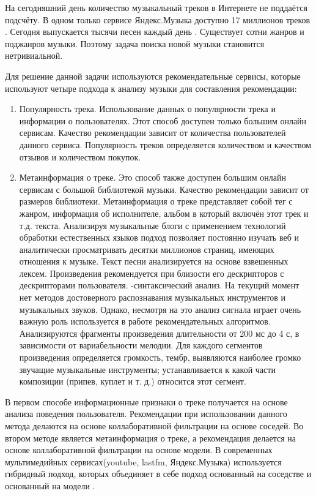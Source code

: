 \label{sec:intro}

На сегодняшний день количество музыкальный треков в Интернете не поддаётся подсчёту. В одном только сервисе Яндекс.Музыка доступно 17 миллионов треков  \cite{yandex_blog} . Сегодня выпускается тысячи песен каждый день \cite{forbes}. Существует сотни жанров и поджанров музыки. Поэтому задача поиска новой музыки становится нетривиальной. 

Для решение данной задачи используются рекомендательные сервисы, которые используют четыре подхода к анализу музыки для составления рекомендации:
\begin{enumerate}[label=\arabic*.]
\item Популярность трека. Использование данных о популярности трека и информации о пользователях. Этот способ доступен только большим онлайн сервисам. Качество рекомендации зависит от количества пользователей данного сервиса. Популярность треков определяется количеством и качеством отзывов и количеством покупок. 
\item Метаинформация о треке. Это способ также доступен большим онлайн сервисам с большой библиотекой музыки. Качество рекомендации зависит от размеров библиотеки. Метаинформация о треке представляет собой тег с жанром, информация об исполнителе, альбом в который включён этот трек и т.д.
 текста. Анализируя музыкальные блоги с применением технологий обработки естественных языков подход позволяет постоянно изучать веб и аналитически просматривать десятки миллионов страниц, имеющих отношения к музыке. Текст песни анализируется на основе взвешенных лексем. Произведения рекомендуется при близости его дескрипторов с дескрипторами пользователя.
-синтаксический анализ. На текущий момент нет методов достоверного распознавания музыкальных инструментов и музыкальных звуков. Однако, несмотря на это анализ сигнала играет очень важную роль используется в работе рекомендательных алгоритмов. Анализируются фрагменты произведения длительности от 200 мс до 4 с, в зависимости от вариабельности мелодии.  Для каждого сегментов произведения определяется громкость, тембр,  выявляются наиболее громко звучащие музыкальные инструменты; устанавливается к какой части композиции (припев, куплет и т. д.) относится этот сегмент.
\end{enumerate}

В первом способе информационные признаки о треке получается на основе анализа поведения пользователя. Рекомендации при использовании данного метода делаются на основе коллаборативной фильтрации на основе соседей. Во втором методе является метаинформация о треке, а рекомендация делается на основе  коллаборативной фильтрации на основе модели. В современных мультимедийных сервисах(youtube, lastfm, Яндекс.Музыка)  используется гибридный подход, которых объединяет в себе подход основанный на соседстве и основанный на модели \cite{yandex_blog_1} \cite{ibm_blog}.

